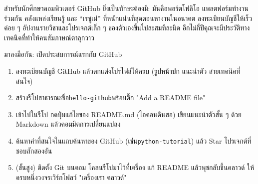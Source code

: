 สำหรับนักศึกษาคอมพิวเตอร์ GitHub ยิ่งเป็นทักษะต้องมี: มันคือพอร์ตโฟลิโอ แพลตฟอร์มทำงานร่วมกัน คลังแหล่งเรียนรู้ และ “เรซูเม่” ที่หนักแน่นที่สุดตอนหางานในอนาคต ลงทะเบียนบัญชีให้เร็ว ค่อย ๆ อัปงานรายวิชาและโปรเจกต์เล็ก ๆ ของตัวเองขึ้นไปสะสมทีละนิด อีกไม่กี่ปีคุณจะมีประวัติทางเทคนิคที่ทำให้คนสัมภาษณ์ตาลุกวาว

\begin{tcbpractice}{มาลงมือกัน: เปิดประสบการณ์แรกกับ GitHub}
\begin{enumerate}
  \item ลงทะเบียนบัญชี GitHub แล้วตกแต่งโปรไฟล์ให้ครบ (รูปหน้าปก แนะนำตัว สายเทคนิคที่สนใจ)
  \item สร้างรีโปสาธารณะชื่อ\texttt{hello-\allowbreak github}พร้อมติ๊ก "Add a README file"
  \item เข้าไปในรีโป กดปุ่มแก้ไขของ README.md (ไอคอนดินสอ) เขียนแนะนำตัวสั้น ๆ ด้วย Markdown แล้วคอมมิตการเปลี่ยนแปลง
  \item ค้นหาคำที่สนใจในแถบค้นหาของ GitHub (เช่น\texttt{python-\allowbreak tutorial}) แล้ว Star โปรเจกต์ที่ชอบสักสองอัน
  \item (ขั้นสูง) ติดตั้ง Git บนคอม โคลนรีโปมาไว้ที่เครื่อง แก้ README แล้วพุชกลับขึ้นคลาวด์ ให้ครบหนึ่งวงจรเวิร์กโฟลว์ "เครื่องเรา คลาวด์"
\end{enumerate}

\end{tcbpractice}
